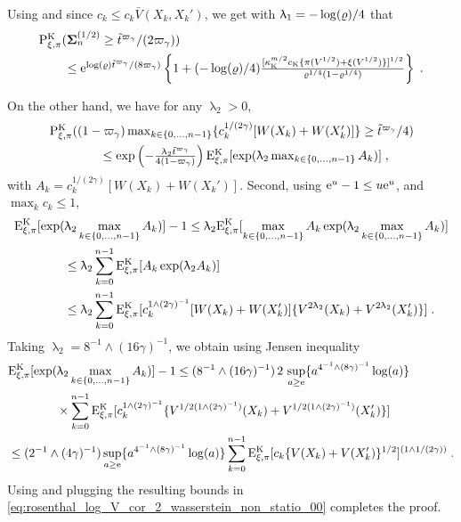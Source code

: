 Using  and since $c_k \leq c_k \bar{V}(X_k,X_k')$, we get with $\uplambda_1 = -\log(\varrho)/4$ that
\begin{align}
  \nonumber
  &  \textstyle \mathrm{P}_{\xi,\pi}^{{\rm K}}(\boldsymbol{\Sigma}^{(1/2)}_n \geq \tilde{t}^{\varpi_{\gamma}}/(2\varpi_{\gamma})) \\
  \label{eq:rosenthal_log_V_cor_2_wasserstein_non_statio_4}
  & \textstyle \qquad \leq \textstyle \mathrm{e}^{\log(\varrho) \tilde{t}^{\varpi_{\gamma}}/(8\varpi_{\gamma})}\left\{ 1+(-\log(\varrho)/4)\frac{[ \kappa_{{\rm K}}^{m/2}  c_{{\rm K}} \{\pi(V^{1/2}) + \xi(V^{1/2})\}]^{1/2}}{\varrho^{1/4}(1-\varrho^{1/4})}\right\} \;.
\end{align}


On the other hand,  we have for any $\uplambda_2 >0$,
\begin{align}
  \nonumber
 &\textstyle \mathrm{P}_{\xi,\pi}^{{\rm K}}( (1-\varpi_{\gamma}) \max_{k\in\{0,\ldots,n-1\}}\{ c_k^{1/(2\gamma)} [W(X_k)+ W(X_k')]\} \geq \tilde{t}^{\varpi_{\gamma}}/4) \\
  \label{eq:rosenthal_log_V_cor_2_wasserstein_non_statio_3}
 &\qquad \qquad \textstyle \leq \exp\left( -\frac{ \uplambda_2 \tilde{t}^{\varpi_{\gamma}}}{4(1-\varpi_{\gamma})}\right)  \mathrm{E}_{\xi,\pi}^{{\rm K}}[\exp( \uplambda_2  \max_{k\in\{0,\ldots,n-1\}}A_k) ] \;,
\end{align}
with $  A_k  =  c_k^{1/(2\gamma)} [W(X_k)+ W(X_k')]$.
Second, using $\mathrm{e}^{u} -1 \leq u \mathrm{e}^u$, and $\max_{k} c_k \leq 1$,
\begin{align*}
&  \mathrm{E}_{\xi,\pi}^{{\rm K}}[\exp( \uplambda_2  \max_{k\in\{0,\ldots,n-1\}}A_k) ]-1 \leq \uplambda_2   \mathrm{E}_{\xi,\pi}^{{\rm K}}[\max\limits_{k\in\{0,\ldots,n-1\}}A_k \exp( \uplambda_2 \max\limits_{k\in\{0,\ldots,n-1\}}A_k)] \\
  & \qquad\qquad\leq \uplambda_2 \sum_{k=0}^{n-1} \mathrm{E}_{\xi,\pi}^{{\rm K}}[A_k \exp(\uplambda_2 A_k)] \\
  & \qquad\qquad \leq \uplambda_2 \sum_{k=0}^{n-1} \mathrm{E}_{\xi,\pi}^{{\rm K}}[c_k^{1\wedge(2\gamma)^{-1}}[W(X_k)+ W(X_k')]\{V^{2\uplambda_2}(X_k) + V^{2\uplambda_2}(X_k')\}] \;.
\end{align*}
Taking $\uplambda_2 = 8^{-1} \wedge (16 \gamma)^{-1}$, we obtain using Jensen inequality
\begin{align*}
  &  \mathrm{E}_{\xi,\pi}^{{\rm K}}[\exp( \uplambda_2  \max_{k\in\{0,\ldots,n-1\}}A_k) ]-1  \leq (8^{-1} \wedge (16 \gamma)^{-1} ) \, 2\, \sup_{a \geq \mathrm{e}} \{a^{4^{-1}\wedge (8\gamma)^{-1}}\log(a)\}\\
  & \qquad \qquad \times \sum_{k=0}^{n-1} \mathrm{E}_{\xi,\pi}^{{\rm K}}[c_k^{1\wedge(2\gamma)^{-1}}\{V^{1/2(1\wedge(2\gamma)^{-1})}(X_k) + V^{1/2(1\wedge(2\gamma)^{-1})}(X_k')\}]\\
  & \leq (2^{-1} \wedge (4 \gamma)^{-1}) \sup_{a \geq \mathrm{e}} \{a^{4^{-1}\wedge (8\gamma)^{-1}}\log(a)\} \sum_{k=0}^{n-1} \mathrm{E}_{\xi,\pi}^{{\rm K}}[c_k\{V(X_k) + V(X_k')\}^{1/2}]^{(1\wedge 1/(2\gamma))} \;.
\end{align*}
Using  and plugging the resulting bounds in \eqref{eq:rosenthal_log_V_cor_2_wasserstein_non_statio_00} completes the proof.


